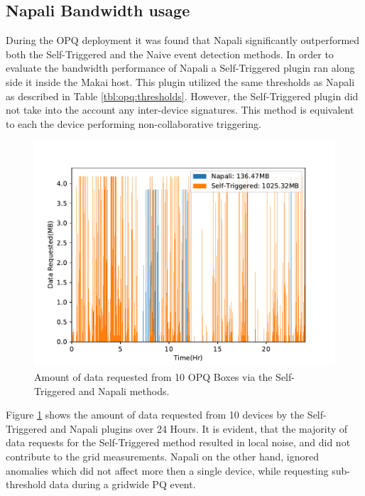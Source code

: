 \subsection{Napali Bandwidth usage}\label{subsec:napali-bandwidth-usage}
During the OPQ deployment it was found that Napali significantly outperformed both the Self-Triggered and the Naive event detection methods.
In order to evaluate the bandwidth performance of Napali a Self-Triggered plugin ran along side it inside the Makai host.
This plugin utilized the same thresholds as Napali as described in Table \ref{tbl:opq:thresholds}.
However, the Self-Triggered plugin did not take into the account any inter-device signatures.
This method is equivalent to each the device performing non-collaborative triggering.
\begin{figure}[h]
    \centering
    \includegraphics[width=0.8\linewidth]{img/napali_eval/napali_request_bandwidth.pdf}
    \caption{Amount of data requested from 10 OPQ Boxes via the Self-Triggered and Napali methods.}
    \label{expdes:fig:self_triggered_bandwidth}
\end{figure}

Figure \ref{expdes:fig:self_triggered_bandwidth} shows the amount of data requested from 10 devices by the Self-Triggered and Napali plugins over 24 Hours.
It is evident, that the majority of data requests for the Self-Triggered method resulted in local noise, and did not contribute to the grid measurements.
Napali on the other hand, ignored anomalies which did not affect more then a single device, while requesting sub-threshold data during a gridwide PQ event.


